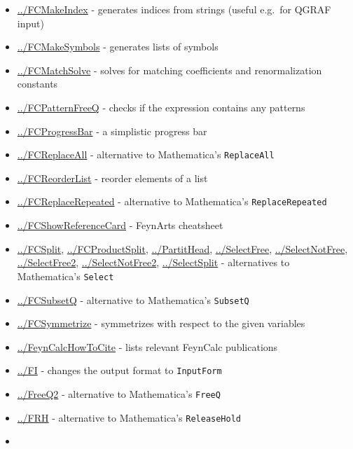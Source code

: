 \documentclass[../FeynCalcManual.tex]{subfiles}
\begin{document}
\begin{itemize}
\item
  \hyperlink{../fcmakeindex}{../FCMakeIndex} - generates indices from
  strings (useful e.g.~for QGRAF input)
\item
  \hyperlink{../fcmakesymbols}{../FCMakeSymbols} - generates lists of
  symbols
\item
  \hyperlink{../fcmatchsolve}{../FCMatchSolve} - solves for matching
  coefficients and renormalization constants
\item
  \hyperlink{../fcpatternfreeq}{../FCPatternFreeQ} - checks if the
  expression contains any patterns
\item
  \hyperlink{../fcprogressbar}{../FCProgressBar} - a simplistic progress
  bar
\item
  \hyperlink{../fcreplaceall}{../FCReplaceAll} - alternative to
  Mathematica's \texttt{ReplaceAll}
\item
  \hyperlink{../fcreorderlist}{../FCReorderList} - reorder elements of a
  list
\item
  \hyperlink{../fcreplacerepeated}{../FCReplaceRepeated} - alternative
  to Mathematica's \texttt{ReplaceRepeated}
\item
  \hyperlink{../fcshowreferencecard}{../FCShowReferenceCard} - FeynArts
  cheatsheet
\item
  \hyperlink{../fcsplit}{../FCSplit},
  \hyperlink{../fcproductsplit}{../FCProductSplit},
  \hyperlink{../partithead}{../PartitHead},
  \hyperlink{../selectfree}{../SelectFree},
  \hyperlink{../selectnotfree}{../SelectNotFree},
  \hyperlink{../selectfree2}{../SelectFree2},
  \hyperlink{../selectnotfree2}{../SelectNotFree2},
  \hyperlink{../selectsplit}{../SelectSplit} - alternatives to
  Mathematica's \texttt{Select}
\item
  \hyperlink{../fcsubsetq}{../FCSubsetQ} - alternative to Mathematica's
  \texttt{SubsetQ}
\item
  \hyperlink{../fcsymmetrize}{../FCSymmetrize} - symmetrizes with
  respect to the given variables
\item
  \hyperlink{../feyncalchowtocite}{../FeynCalcHowToCite} - lists
  relevant FeynCalc publications
\item
  \hyperlink{../fi}{../FI} - changes the output format to
  \texttt{InputForm}
\item
  \hyperlink{../freeq2}{../FreeQ2} - alternative to Mathematica's
  \texttt{FreeQ}
\item
  \hyperlink{../frh}{../FRH} - alternative to Mathematica's
  \texttt{ReleaseHold}
\item

\end{itemize}
\end{document}

